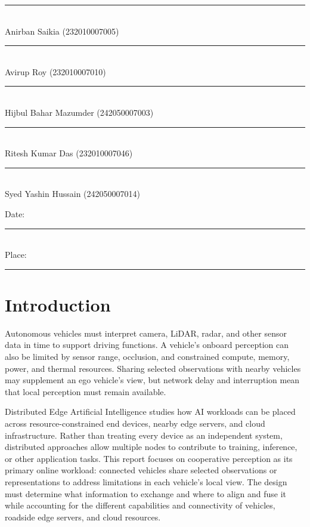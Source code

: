 \documentclass[12pt,a4paper,oneside]{report}
\begin{document}
\vspace{0.8cm}
\begin{flushright}
  \rule{4cm}{0.4pt}\\[-0.05cm]
  Anirban Saikia (232010007005)\\[0.5cm]
  \rule{4cm}{0.4pt}\\[-0.05cm]
  Avirup Roy (232010007010)\\[0.5cm]
  \rule{4cm}{0.4pt}\\[-0.05cm]
  Hijbul Bahar Mazumder (242050007003)\\[0.5cm]
  \rule{4cm}{0.4pt}\\[-0.05cm]
  Ritesh Kumar Das (232010007046)\\[0.5cm]
  \rule{4cm}{0.4pt}\\[-0.05cm]
  Syed Yashin Hussain (242050007014)
\end{flushright}

\vfill
\noindent
Date: \rule{4cm}{0.4pt}\\[0.2cm]
Place: \rule{4cm}{0.4pt}

\clearpage
\tableofcontents
\clearpage
\listoftables
\clearpage
\listoffigures
\clearpage


\chapter{Introduction}

Autonomous vehicles must interpret camera, LiDAR, radar, and other sensor
data in time to support driving functions. A vehicle's onboard perception
can also be limited by sensor range, occlusion, and constrained compute,
memory, power, and thermal resources. Sharing selected observations with
nearby vehicles may supplement an ego vehicle's view, but network delay and
interruption mean that local perception must remain available.

Distributed Edge Artificial Intelligence studies how AI workloads can be
placed across resource-constrained end devices, nearby edge servers, and
cloud infrastructure. Rather than treating every device as an independent
system, distributed approaches allow multiple nodes to contribute to
training, inference, or other application tasks. This report focuses on
cooperative perception as its primary online workload: connected vehicles
share selected observations or representations to address limitations in
each vehicle's local view. The design must determine what information to
exchange and where to align and fuse it while accounting for the different
capabilities and connectivity of vehicles, roadside edge servers, and cloud
resources.
\end{document}
